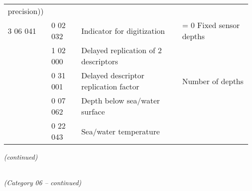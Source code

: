 \begin{longtable}[]{@{}llll@{}}
\begin{minipage}[t]{0.22\columnwidth}
precision))\strut
\end{minipage} & \begin{minipage}[t]{0.22\columnwidth}\raggedright
\strut
\end{minipage}\tabularnewline
3 06 041 & 0 02 032 & Indicator for digitization & = 0 Fixed sensor depths\tabularnewline
& 1 02 000 & Delayed replication of 2 descriptors &\tabularnewline
& 0 31 001 & Delayed descriptor replication factor & Number of depths\tabularnewline
& 0 07 062 & Depth below sea/water surface &\tabularnewline
& 0 22 043 & Sea/water temperature &\tabularnewline
\bottomrule
\end{longtable}

\emph{(continued)}

\emph{\\
(Category 06 -- continued)}

